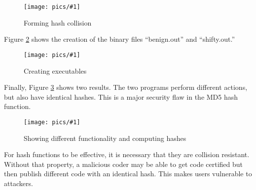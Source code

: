 \documentclass[11pt]{article}
\newcommand{\fig}[2]{ 
\begin{figure}[h]
	\centering
	\caption{#2}
	\texttt{[image: pics/\#1]}
	\label{fig:#1}
\end{figure} 
}
\begin{document}
\fig{task4.1}{Forming hash collision}

Figure \ref{fig:task4.2} shows the creation of the binary files ``benign.out'' and ``shifty.out.''

\fig{task4.2}{Creating executables}

\newpage
Finally, Figure \ref{fig:task4.3} shows two results. The two programs perform different actions, but also have identical hashes. This is a major security flaw in the MD5 hash function.

\fig{task4.3}{Showing different functionality and computing hashes}

For hash functions to be effective, it is necessary that they are collision resistant. Without that property, a malicious coder may be able to get code certified but then publish different code with an identical hash. This makes users vulnerable to attackers.
\end{document}
